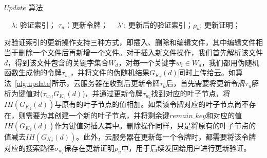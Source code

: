 \begin{algorithm}[ht]
  \caption{$Update$ 算法}
  \label{alg:update}
  \begin{algorithmic}[1]
    \REQUIRE ~~{$\lambda$: 验证索引； $\tau_u$：更新令牌；}
    \ENSURE ~~{$\lambda'$: 更新后的验证索引；$\rho_u$: 更新证明；}
                \ENDIF
              \ENDFOR
  \end{algorithmic}
\end{algorithm}


对验证索引的更新操作支持三种方式，即插入、删除和编辑文件，其中编辑文件相当于删除一个文件后再新增一个文件。对于插入新文件操作，我们首先解析该文件$d$，得到该文件包含的关键字集合$W_d$，对每一个关键字$w_i \in W_d$，我们都用伪随机函数生成他的令牌$\tau_{w_i }$，并将文件的伪随机结果$G_{K_2}(d)$同时上传给云。如算法~\ref{alg:update}所示，云服务器在收到后更新令牌$\tau_u$后，首先需要将更新令牌$\tau_u$解析为键值对($\tau_{w_i}$,$G_{K_2}(d)$)，并通过更新令牌$\tau_{w_i}$找到对应的叶子节点，将$IH(G_{K_2}(d))$与原有的叶子节点的值相加。如果该令牌对应的叶子节点尚不存在，则需要为其创建一个新的叶子节点，并将剩余键$remain\_key$和对应的值$IH(G_{K_2}(d))$作为键值对插入其中。删除操作同样，只是将原有的叶子节点的值减去$IH(G_{K_2}(d))$。此外，云服务器在更新每一个令牌时，都需要将该令牌对应的搜索路径$\sigma_{w_i}$保存在更新证明$\rho_u$中，用于后续发回给用户进行更新验证。


